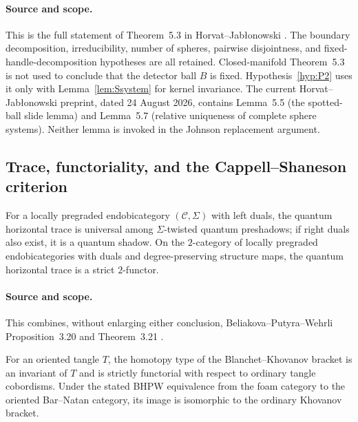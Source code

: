 \paragraph{Source and scope.}
This is the full statement of Theorem~5.3 in
Horvat--Jab\l onowski \cite[Theorem~5.3]{HorvatJablonowski2025}.
The boundary decomposition, irreducibility, number of spheres, pairwise
disjointness, and fixed-handle-decomposition hypotheses are all retained.
Closed-manifold Theorem~5.3 is not used to conclude that the detector ball
$B$ is fixed.  Hypothesis~\ref{hyp:P2} uses it only with
Lemma~\ref{lem:Ssystem} for kernel invariance.  The current
Horvat--Jab\l onowski preprint, dated 24 August 2026, contains Lemma~5.5
(the spotted-ball slide lemma) and Lemma~5.7 (relative uniqueness of
complete sphere systems).  Neither lemma is invoked in the Johnson
replacement argument.

\subsection{Trace, functoriality, and the Cappell--Shaneson criterion}

\begin{externalresult}\label{prop:bpw-trace}
For a locally pregraded endobicategory $(\mathcal C,\Sigma)$ with left duals,
the quantum horizontal trace is universal among $\Sigma$-twisted quantum
preshadows; if right duals also exist, it is a quantum shadow.  On the
$2$-category of locally pregraded endobicategories with duals and
degree-preserving structure maps, the quantum horizontal trace is a strict
$2$-functor.
\end{externalresult}

\paragraph{Source and scope.}
This combines, without enlarging either conclusion, Beliakova--Putyra--Wehrli
Proposition~3.20 and Theorem~3.21
\cite[Proposition~3.20 and Theorem~3.21]{BeliakovaPutyraWehrli2019}.

\begin{externalresult}\label{prop:bhpw}
For an oriented tangle $T$, the homotopy type of the Blanchet--Khovanov
bracket is an invariant of $T$ and is strictly functorial with respect to
ordinary tangle cobordisms.  Under the stated BHPW equivalence from the foam
category to the oriented Bar--Natan category, its image is isomorphic to the
ordinary Khovanov bracket.
\end{externalresult}


